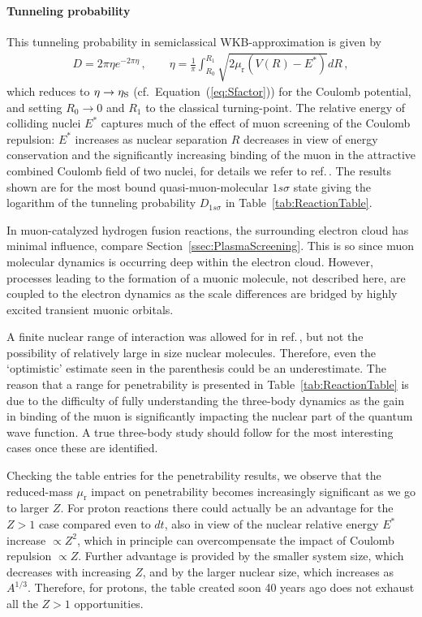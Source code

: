 \documentclass[particles,article,accept,pdftex,moreauthors]{Definitions/mdpi}
\newcommand{\req}[1]{Equation~(\ref{#1})}
\newcommand{\rt}[1]{Table~\ref{#1}}
\newcommand{\rsec}[1]{Section~\ref{#1}}
\begin{document}
\paragraph*{\bf Tunneling probability}
This tunneling probability in semiclassical WKB-approximation is given by 
\begin{align}
D=2\pi\eta e^{-2\pi\eta}\,,\qquad \eta=\frac{1}{\pi}\int_{R_0}^{R_1}\sqrt{2\mu_\mathrm{r}(V(R)-E^*)}dR\,,
\end{align}
which reduces to $\eta\to\eta_{\rm S}$ (cf.~\req{eq:Sfactor}) for the Coulomb potential, and setting $R_0\to0$ and $R_1$ to the classical turning-point. The relative energy of colliding nuclei $E^*$ captures much of the effect of muon screening of the Coulomb repulsion: $E^*$ increases as nuclear separation $R$ decreases in view of energy conservation and the significantly increasing binding of the muon in the attractive combined Coulomb field of two nuclei, for details we refer to ref.\,\cite{Harley:1988wp}. The results shown are for the most bound quasi-muon-molecular $1s\sigma$ state giving the logarithm of the tunneling probability $D_{1s\sigma}$ in \rt{tab:ReactionTable}. 

In muon-catalyzed hydrogen fusion reactions, the surrounding electron cloud has minimal influence, compare \rsec{ssec:PlasmaScreening}. This is so since muon molecular dynamics is occurring deep within the electron cloud. However, processes leading to the formation of a muonic molecule, not described here, are coupled to the electron dynamics as the scale differences are bridged by highly excited transient muonic orbitals.

A finite nuclear range of interaction was allowed for in ref.\,\cite{Harley:1988wp}, but not the possibility of relatively large in size nuclear molecules. Therefore, even the `optimistic' estimate seen in the parenthesis could be an underestimate. The reason that a range for penetrability is presented in \rt{tab:ReactionTable} is due to the difficulty of fully understanding the three-body dynamics as the gain in binding of the muon is significantly impacting the nuclear part of the quantum wave function. A true three-body study should follow for the most interesting cases once these are identified.

Checking the table entries for the penetrability results, we observe that the reduced-mass $\mu_\mathrm{r}$ impact on penetrability becomes increasingly significant as we go to larger $Z$. For proton reactions there could actually be an advantage for the $Z > 1$ case compared even to $dt$, also in view of the nuclear relative energy $E^*$ increase $\propto Z^2$, which in principle can overcompensate the impact of Coulomb repulsion $\propto Z$. Further advantage is provided by the smaller system size, which decreases with increasing $Z$, and by the larger nuclear size, which increases as $A^{1/3}$. Therefore, for protons, the table created soon 40 years ago does not exhaust all the $Z>1$ opportunities.
\end{document}
